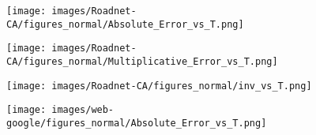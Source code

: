 \begin{figure*}[htbp]
\begin{subfigure}[b]{\textwidth}
\centering
\begin{minipage}[b]{0.05\textwidth}
	\centering
\end{minipage}%
\begin{minipage}[b]{0.3\textwidth}
	\centering
	\texttt{[image: images/Roadnet-CA/figures\_normal/Absolute\_Error\_vs\_T.png]} %
	
\end{minipage}%
\begin{minipage}[b]{0.3\textwidth}
	\centering
	
	\texttt{[image: images/Roadnet-CA/figures\_normal/Multiplicative\_Error\_vs\_T.png]} %
	
\end{minipage}%
\begin{minipage}[b]{0.3\textwidth}
	\centering
	
	\texttt{[image: images/Roadnet-CA/figures\_normal/inv\_vs\_T.png]} %
\end{minipage}
\end{subfigure}
\begin{subfigure}[b]{\textwidth}
\centering
\begin{minipage}[b]{0.05\textwidth}
	\centering
\end{minipage}%
\begin{minipage}[b]{0.3\textwidth}
	\centering
	\texttt{[image: images/web-google/figures\_normal/Absolute\_Error\_vs\_T.png]} %
	

\end{minipage}
\end{subfigure}
\end{figure*}
